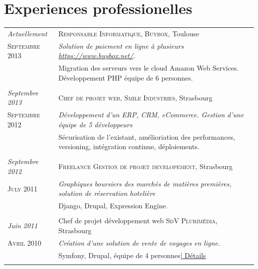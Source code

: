 \documentclass[a4paper,10pt]{article}
\begin{document}
\section{Experiences professionelles}
\begin{tabular}{p{}|p{}}	

	\emph{Actuellement} & \textsc{Responsable Informatique, Buybox}, Toulouse \\\textsc{Septembre 2013}&\emph{Solution de paiement en ligne à plusieurs \href{https://www.buybox.net/}{https://www.buybox.net/}.}\\&\footnotesize{Migration des serveurs vers le cloud Amazon Web Services. Développement PHP équipe de 6 personnes.}\\\multicolumn{2}{c}{} \\

	\emph{Septembre 2013} & \textsc{Chef de projet web, Smile Industries}, Strasbourg \\\textsc{Septembre 2012}&\emph{Développement d'un ERP, CRM, eCommerce. Gestion d'une équipe de 5 développeurs}\\&\footnotesize{Sécurisation de l'existant, amélioriation des performances, versioning, intégration continue, déploiements.}\\\multicolumn{2}{c}{} \\

	\emph{Septembre 2012} & \textsc{Freelance Gestion de projet developement}, Strasbourg \\\textsc{July 2011}&\emph{Graphiques boursiers des marchés de matières premières, solution de réservation hotelière}\\&\footnotesize{Django, Drupal, Expression Engine.}\\\multicolumn{2}{c}{} \\

\emph{Juin 2011} & Chef de projet développement web \textsc{SdV Plurimédia}, Strasbourg \\\textsc{Avril 2010}&\emph{Création d'une solution de vente de voyages en ligne.}\\&\footnotesize{Symfony, Drupal, équipe de 4 personnes\hyperlink{sdv}{\hfill | \footnotesize Détails}}\\\multicolumn{2}{c}{} \\
  

\end{tabular}
\end{document}

